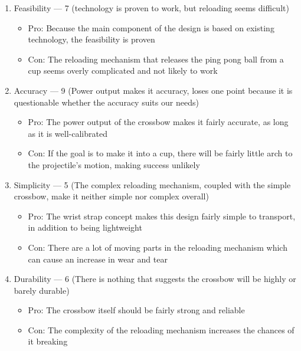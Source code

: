 \begin{enumerate}

  \item Feasibility — 7 (technology is proven to work, but reloading seems difficult)

    \begin{itemize}

      \item Pro: Because the main component of the design is based on existing technology, the feasibility is proven

      \item Con: The reloading mechanism that releases the ping pong ball from a cup seems overly complicated and not likely to work

    \end{itemize}

  \item Accuracy — 9 (Power output makes it accuracy, loses one point because it is questionable whether the accuracy suits our needs)

    \begin{itemize}

      \item Pro: The power output of the crossbow makes it fairly accurate, as long as it is well-calibrated

      \item Con: If the goal is to make it into a cup, there will be fairly little arch to the projectile's motion, making success unlikely

    \end{itemize}

  \item Simplicity — 5 (The complex reloading mechanism, coupled with the simple crossbow, make it neither simple nor complex overall)

    \begin{itemize}

      \item Pro: The wrist strap concept makes this design fairly simple to transport, in addition to being lightweight

      \item Con: There are a lot of moving parts in the reloading mechanism which can cause an increase in wear and tear

    \end{itemize}

  \item Durability — 6 (There is nothing that suggests the crossbow will be highly or barely durable)

    \begin{itemize}

      \item Pro: The crossbow itself should be fairly strong and reliable

      \item Con: The complexity of the reloading mechanism increases the chances of it breaking

    \end{itemize}

\end{enumerate}

